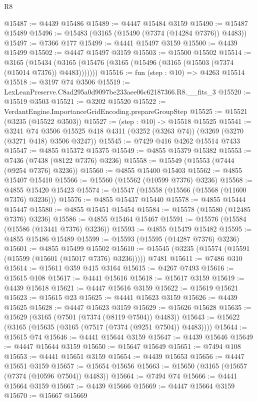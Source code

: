 \begin{lexlean}{R8}
\begin{coremodule}
@15487 := @4439 @15486
@15489 := @4447 @15484 @3159
@15490 := @15487 @15489
@15496 := @15483 (@3165 (@15490 (@7374 (@14284 @7376)) @4483))
@15497 := @7366 @177
@15499 := @4441 @15497 @3159
@15500 := @4439 @15499
@15502 := @4447 @15497 @3159
@15503 := @15500 @15502
@15514 := @3165
    (@15434 (@3165 (@15476 (@3165 (@15496 (@3165 (@15503 (@7374 (@15014 @7376)) @4483)))))))
@15516 := fun (step : @10) => @4263 @15514
@15518 := @3197 @74 @3506
@15519 := LexLeanPreserve.C8ad295a0d9097be233aee06c62187366.R8.__fits_3
@15520 := @15519 @3503
@15521 := @3202 @15520
@15522 := VerdantEngine.ImportanceGridEncoding.prepareGroupStep
@15525 := @15521 (@3235 (@15522 @3503))
@15527 := (step : @10) -> @15518 @15525
@15541 := @3241
    @74
    @3506
    @15525
    @418
    @4311
    (@3252 (@3263 @74))
    (@3269 (@3270 (@3271 @418) @3506 @3247))
@15545 := @7429 @416 @4262 @15514 @7433
@15547 := @4855 @15372 @15375
@15549 := @4855 @15379 @15382
@15553 := @7436 (@7438 (@8122 @7376) @3236)
@15558 := @15549 (@15553 (@7444 (@9254 @7376) @3236))
@15560 := @4855 @15400 @15403
@15562 := @4855 @15407 @15410
@15566 := @15560 (@15562 (@10599 @7376) @3236)
@15568 := @4855 @15420 @15423
@15574 := @15547 (@15558 (@15566 (@15568 (@11600 @7376) @3236)))
@15576 := @4855 @15437 @15440
@15578 := @4855 @15444 @15447
@15580 := @4855 @15451 @15454
@15584 := @15578 (@15580 (@12485 @7376) @3236)
@15586 := @4855 @15464 @15467
@15591 := @15576 (@15584 (@15586 (@13441 @7376) @3236))
@15593 := @4855 @15479 @15482
@15595 := @4855 @15486 @15489
@15599 := @15593 (@15595 (@14287 @7376) @3236)
@15601 := @4855 @15499 @15502
@15610 := @15545 (@3235 (@15574 (@15591 (@15599 (@15601 (@15017 @7376) @3236))))) @7481
@15611 := @7486 @310
@15614 := @15611 @359 @415 @3164
@15615 := @4267 @7493
@15616 := @15615 @108
@15617 := @4441 @15616
@15618 := @15617 @3159
@15619 := @4439 @15618
@15621 := @4447 @15616 @3159
@15622 := @15619 @15621
@15623 := @15615 @23
@15625 := @4441 @15623 @3159
@15626 := @4439 @15625
@15628 := @4447 @15623 @3159
@15629 := @15626 @15628
@15635 := @15629 (@3165 (@7501 (@7374 (@8119 @7504)) @4483))
@15643 := @15622 (@3165 (@15635 (@3165 (@7517 (@7374 (@9251 @7504)) @4483))))
@15644 := @15615 @74
@15646 := @4441 @15644 @3159
@15647 := @4439 @15646
@15649 := @4447 @15644 @3159
@15650 := @15647 @15649
@15651 := @7494 @108
@15653 := @4441 @15651 @3159
@15654 := @4439 @15653
@15656 := @4447 @15651 @3159
@15657 := @15654 @15656
@15663 := @15650 (@3165 (@15657 (@7374 (@10596 @7504)) @4483))
@15664 := @7494 @74
@15666 := @4441 @15664 @3159
@15667 := @4439 @15666
@15669 := @4447 @15664 @3159
@15670 := @15667 @15669

\end{coremodule}
\end{lexlean}
